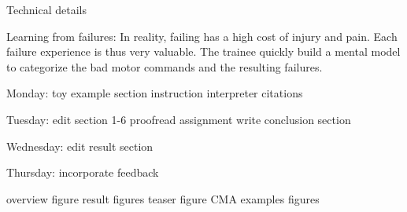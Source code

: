 Technical details


Learning from failures: In reality, failing has a high cost of injury and pain. Each failure experience is thus very valuable. The trainee quickly build a mental model to categorize the bad motor commands and the resulting failures. 


Monday:
toy example section
instruction interpreter
citations

Tuesday:
edit section 1-6
proofread assignment
write conclusion section

Wednesday:
edit result section

Thursday:
incorporate feedback

overview figure
result figures
teaser figure
CMA examples figures